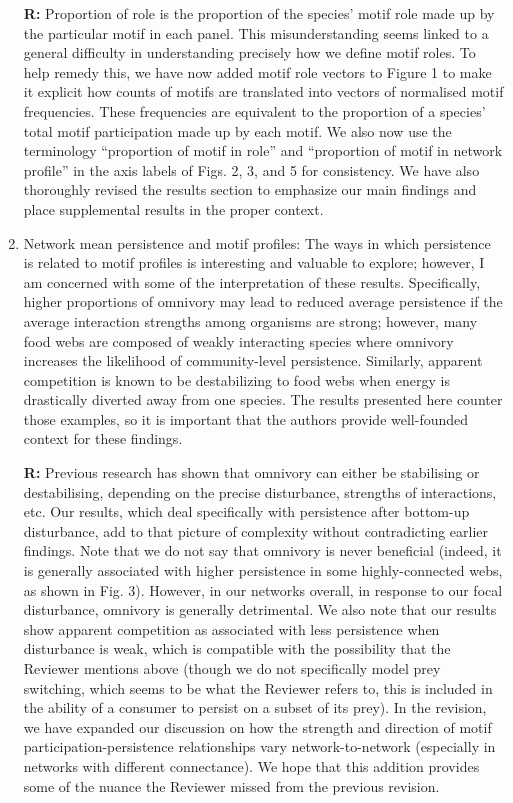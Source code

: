 \documentclass[12pt]{article}
\begin{document}
\begin{enumerate}
                \textbf{R:} Proportion of role is the proportion of the species' motif role made up by the particular motif in each panel. This misunderstanding seems linked to a general difficulty in understanding precisely how we define motif roles. To help remedy this, we have now added motif role vectors to Figure 1 to make it explicit how counts of motifs are translated into vectors of normalised motif frequencies. These frequencies are equivalent to the proportion of a species' total motif participation made up by each motif. We also now use the terminology ``proportion of motif in role'' and ``proportion of motif in network profile'' in the axis labels of Figs. 2, 3, and 5 for consistency. We have also thoroughly revised the results section to emphasize our main findings and place supplemental results in the proper context.


            \item Network mean persistence and motif profiles: The ways in which persistence is related to motif profiles is interesting and valuable to explore; however, I am concerned with some of the interpretation of these results. Specifically, higher proportions of omnivory may lead to reduced average persistence if the average interaction strengths among organisms are strong; however, many food webs are composed of weakly interacting species where omnivory increases the likelihood of community-level persistence. Similarly, apparent competition is known to be destabilizing to food webs when energy is drastically diverted away from one species. The results presented here counter those examples, so it is important that the authors provide well-founded context for these findings.

                \textbf{R:} Previous research has shown that omnivory can either be stabilising or destabilising, depending on the precise disturbance, strengths of interactions, etc. Our results, which deal specifically with persistence after bottom-up disturbance, add to that picture of complexity without contradicting earlier findings. Note that we do not say that omnivory is never beneficial (indeed, it is generally associated with higher persistence in some highly-connected webs, as shown in Fig. 3). However, in our networks overall, in response to our focal disturbance, omnivory is generally detrimental. We also note that our results show apparent competition as associated with less persistence when disturbance is weak, which is compatible with the possibility that the Reviewer mentions above (though we do not specifically model prey switching, which seems to be what the Reviewer refers to, this is included in the ability of a consumer to persist on a subset of its prey).  In the revision, we have expanded our discussion on how the strength and direction of motif participation-persistence relationships vary network-to-network (especially in networks with different connectance). We hope that this addition provides some of the nuance the Reviewer missed from the previous revision.



\end{enumerate}
\end{document}
